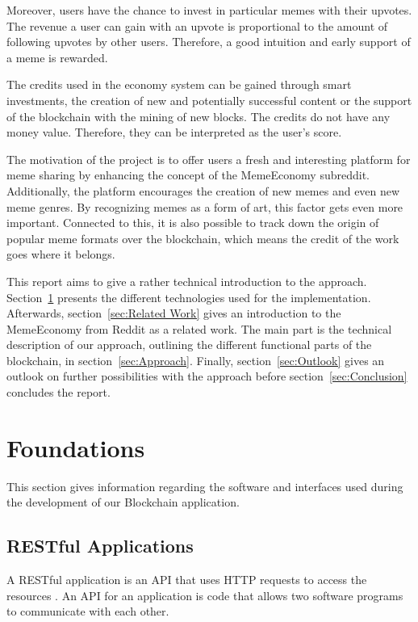 \documentclass[12pt]{article}
\begin{document}
    Moreover, users have the chance to invest in particular memes with their upvotes. The revenue a user can gain with an upvote is proportional to the amount of following upvotes by other users. Therefore, a good intuition and early support of a meme is rewarded.
    
    The credits used in the economy system can be gained through smart investments, the creation of new and potentially successful content or the support of the blockchain with the mining of new blocks. The credits do not have any money value. Therefore, they can be interpreted as the user's score.
    
    The motivation of the project is to offer users a fresh and interesting platform for meme sharing by enhancing the concept of the MemeEconomy subreddit. Additionally, the platform encourages the creation of new memes and even new meme genres. By recognizing memes as a form of art, this factor gets even more important. Connected to this, it is also possible to track down the origin of popular meme formats over the blockchain, which means the credit of the work goes where it belongs.

    This report aims to give a rather technical introduction to the approach. Section~\ref{sec:Foundations} presents the different technologies used for the implementation. Afterwards, section~\ref{sec:Related Work} gives an introduction to the MemeEconomy from Reddit as a related work. The main part is the technical description of our approach, outlining the different functional parts of the blockchain, in section~\ref{sec:Approach}. Finally, section~\ref{sec:Outlook} gives an outlook on further possibilities with the approach before section~\ref{sec:Conclusion} concludes the report.


\section{Foundations} \label{sec:Foundations} %
This section gives information regarding the software and interfaces used during the development of our Blockchain application.

\subsection{RESTful Applications}

A RESTful application is an \ac{API} that uses HTTP requests to access the resources \cite{Restful}. An API for an application is code that allows two software programs to communicate with each other.
\end{document}
